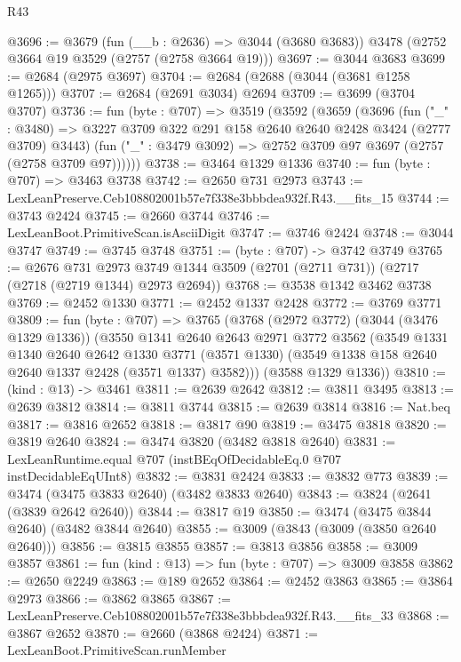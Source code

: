 \begin{lexlean}{R43}
\begin{coremodule}
@3696 := @3679
    (fun (__b : @2636) => @3044 (@3680 @3683))
    @3478
    (@2752 @3664 @19 @3529 (@2757 (@2758 @3664 @19)))
@3697 := @3044 @3683
@3699 := @2684 (@2975 @3697)
@3704 := @2684 (@2688 (@3044 (@3681 @1258 @1265)))
@3707 := @2684 (@2691 @3034) @2694
@3709 := @3699 (@3704 @3707)
@3736 := fun (byte : @707) =>
  @3519
    (@3592
      (@3659
        (@3696
          (fun ("_" : @3480) =>
          @3227 @3709 @322 @291 @158 @2640 @2640 @2428 @3424 (@2777 @3709) @3443)
          (fun ("_" : @3479 @3092) => @2752 @3709 @97 @3697 (@2757 (@2758 @3709 @97))))))
@3738 := @3464 @1329 @1336
@3740 := fun (byte : @707) => @3463 @3738
@3742 := @2650 @731 @2973
@3743 := LexLeanPreserve.Ceb108802001b57e7f338e3bbbdea932f.R43.__fits_15
@3744 := @3743 @2424
@3745 := @2660 @3744
@3746 := LexLeanBoot.PrimitiveScan.isAsciiDigit
@3747 := @3746 @2424
@3748 := @3044 @3747
@3749 := @3745 @3748
@3751 := (byte : @707) -> @3742 @3749
@3765 := @2676
    @731
    @2973
    @3749
    @1344
    @3509
    (@2701 (@2711 @731))
    (@2717 (@2718 (@2719 @1344) @2973 @2694))
@3768 := @3538 @1342 @3462 @3738
@3769 := @2452 @1330
@3771 := @2452 @1337 @2428
@3772 := @3769 @3771
@3809 := fun (byte : @707) =>
  @3765
    (@3768
      (@2972 @3772)
      (@3044 (@3476 @1329 @1336))
      (@3550
        @1341
        @2640
        @2643
        @2971
        @3772
        @3562
        (@3549
          @1331
          @1340
          @2640
          @2642
          @1330
          @3771
          (@3571 @1330)
          (@3549 @1338 @158 @2640 @2640 @1337 @2428 (@3571 @1337) @3582)))
      (@3588 @1329 @1336))
@3810 := (kind : @13) -> @3461
@3811 := @2639 @2642
@3812 := @3811 @3495
@3813 := @2639 @3812
@3814 := @3811 @3744
@3815 := @2639 @3814
@3816 := Nat.beq
@3817 := @3816 @2652
@3818 := @3817 @90
@3819 := @3475 @3818
@3820 := @3819 @2640
@3824 := @3474 @3820 (@3482 @3818 @2640)
@3831 := LexLeanRuntime.equal @707 (instBEqOfDecidableEq.{0} @707 instDecidableEqUInt8)
@3832 := @3831 @2424
@3833 := @3832 @773
@3839 := @3474 (@3475 @3833 @2640) (@3482 @3833 @2640)
@3843 := @3824 (@2641 (@3839 @2642 @2640))
@3844 := @3817 @19
@3850 := @3474 (@3475 @3844 @2640) (@3482 @3844 @2640)
@3855 := @3009 (@3843 (@3009 (@3850 @2640 @2640)))
@3856 := @3815 @3855
@3857 := @3813 @3856
@3858 := @3009 @3857
@3861 := fun (kind : @13) => fun (byte : @707) => @3009 @3858
@3862 := @2650 @2249
@3863 := @189 @2652
@3864 := @2452 @3863
@3865 := @3864 @2973
@3866 := @3862 @3865
@3867 := LexLeanPreserve.Ceb108802001b57e7f338e3bbbdea932f.R43.__fits_33
@3868 := @3867 @2652
@3870 := @2660 (@3868 @2424)
@3871 := LexLeanBoot.PrimitiveScan.runMember

\end{coremodule}
\end{lexlean}
